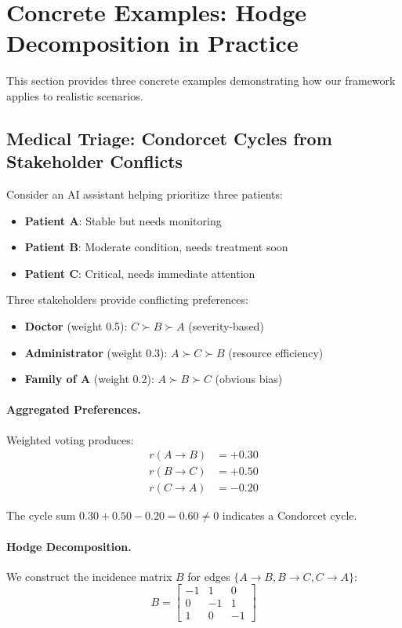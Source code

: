 \section{Concrete Examples: Hodge Decomposition in Practice}
\label{app:examples}

This section provides three concrete examples demonstrating how our framework applies to realistic scenarios.

\subsection{Medical Triage: Condorcet Cycles from Stakeholder Conflicts}

Consider an AI assistant helping prioritize three patients:
\begin{itemize}
    \item \textbf{Patient A}: Stable but needs monitoring
    \item \textbf{Patient B}: Moderate condition, needs treatment soon
    \item \textbf{Patient C}: Critical, needs immediate attention
\end{itemize}

Three stakeholders provide conflicting preferences:
\begin{itemize}
    \item \textbf{Doctor} (weight 0.5): $C \succ B \succ A$ (severity-based)
    \item \textbf{Administrator} (weight 0.3): $A \succ C \succ B$ (resource efficiency)
    \item \textbf{Family of A} (weight 0.2): $A \succ B \succ C$ (obvious bias)
\end{itemize}

\paragraph{Aggregated Preferences.}
Weighted voting produces:
\begin{align}
r(A \to B) &= +0.30 \\
r(B \to C) &= +0.50 \\
r(C \to A) &= -0.20
\end{align}

The cycle sum $0.30 + 0.50 - 0.20 = 0.60 \neq 0$ indicates a Condorcet cycle.

\paragraph{Hodge Decomposition.}
We construct the incidence matrix $B$ for edges $\{A \to B, B \to C, C \to A\}$:
\begin{equation}
B = \begin{bmatrix}
-1 & 1 & 0 \\
0 & -1 & 1 \\
1 & 0 & -1
\end{bmatrix}
\end{equation}

